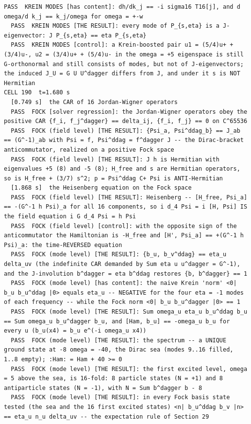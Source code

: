 \begin{Verbatim}[fontsize=\scriptsize]
  PASS  KREIN MODES [has content]: dh/dk_j == -i sigma16 T16[j], and d omega/d k_j == k_j/omega for omega = +-w
  PASS  KREIN MODES [THE RESULT]: every mode of P_{s,eta} is a J-eigenvector: J P_{s,eta} == eta P_{s,eta}
  PASS  KREIN MODES [control]: a Krein-boosted pair u1 = (5/4)u+ + (3/4)u-, u2 = (3/4)u+ + (5/4)u- in the omega = +5 eigenspace is still G-orthonormal and still consists of modes, but not of J-eigenvectors; the induced J_U = G U U^dagger differs from J, and under it s is NOT Hermitian
CELL 190  t=1.680 s
  [0.749 s]  the CAR of 16 Jordan-Wigner operators
  PASS  FOCK [solver regression]: the Jordan-Wigner operators obey the positive CAR {f_i, f_j^dagger} == delta_ij, {f_i, f_j} == 0 on C^65536
  PASS  FOCK (field level) [THE RESULT]: {Psi_a, Psi^ddag_b} == J_ab == (G^-1)_ab with Psi = f, Psi^ddag = f^dagger J -- the Dirac-bracket anticommutator, realized on a positive Fock space
  PASS  FOCK (field level) [THE RESULT]: J h is Hermitian with eigenvalues +5 (8) and -5 (8); H_free and s are Hermitian operators, so is H_free + (3/7) s^2; p = Psi^ddag C+ Psi is ANTI-Hermitian
  [1.868 s]  the Heisenberg equation on the Fock space
  PASS  FOCK (field level) [THE RESULT]: Heisenberg -- [H_free, Psi_a] == -(G^-1 h Psi)_a for all 16 components, so i d_4 Psi = i [H, Psi] IS the field equation i G d_4 Psi = h Psi
  PASS  FOCK (field level) [control]: with the opposite sign of the anticommutator the Hamiltonian is -H_free and [H', Psi_a] == +(G^-1 h Psi)_a: the time-REVERSED equation
  PASS  FOCK (mode level) [THE RESULT]: {b_u, b_v^ddag} == eta_u delta_uv (the indefinite CAR demanded by Sum eta u u^dagger = G^-1), and the J-involution b^dagger = eta b^ddag restores {b, b^dagger} == 1
  PASS  FOCK (mode level) [has content]: the naive Krein 'norm' <0| b_u b_u^ddag |0> equals eta_u -- NEGATIVE for the four eta = -1 modes of each frequency -- while the Fock norm <0| b_u b_u^dagger |0> == 1
  PASS  FOCK (mode level) [THE RESULT]: Sum omega_u eta_u b_u^ddag b_u == Sum omega_u b_u^dagger b_u, and [Ham, b_u] == -omega_u b_u for every u (b_u(x4) = b_u e^(-i omega_u x4))
  PASS  FOCK (mode level) [THE RESULT]: the spectrum -- a UNIQUE ground state at -8 omega = -40, the Dirac sea (modes 9..16 filled, 1..8 empty); :Ham: = Ham + 40 >= 0
  PASS  FOCK (mode level) [THE RESULT]: the first excited level, omega = 5 above the sea, is 16-fold: 8 particle states (N = +1) and 8 antiparticle states (N = -1), with N = Sum b^dagger b - 8
  PASS  FOCK (mode level) [THE RESULT]: in every Fock basis state tested (the sea and the 16 first excited states) <n| b_u^ddag b_v |n> == eta_u n_u delta_uv -- the expectation rule of Section 29

\end{Verbatim}

